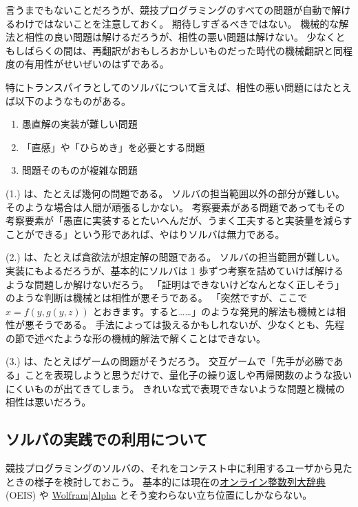 \documentclass{ltjsarticle}
\begin{document}
言うまでもないことだろうが、競技プログラミングのすべての問題が自動で解けるわけではないことを注意しておく。
期待しすぎるべきではない。
機械的な解法と相性の良い問題は解けるだろうが、相性の悪い問題は解けない。
少なくともしばらくの間は、再翻訳がおもしろおかしいものだった時代の機械翻訳と同程度の有用性がせいぜいのはずである。

特にトランスパイラとしてのソルバについて言えば、相性の悪い問題にはたとえば以下のようなものがある。

\begin{enumerate}[label=(\arabic{enumi}.)]
    \item 愚直解の実装が難しい問題
    \item 「直感」や「ひらめき」を必要とする問題
    \item 問題そのものが複雑な問題
\end{enumerate}

(1.) は、たとえば幾何の問題である。
ソルバの担当範囲以外の部分が難しい。
そのような場合は人間が頑張るしかない。
考察要素がある問題であってもその考察要素が「愚直に実装するとたいへんだが、うまく工夫すると実装量を減らすことができる」という形であれば、やはりソルバは無力である。

(2.) は、たとえば貪欲法が想定解の問題である。
ソルバの担当範囲が難しい。
実装にもよるだろうが、基本的にソルバは 1 歩ずつ考察を詰めていけば解けるような問題しか解けないだろう。
「証明はできないけどなんとなく正しそう」のような判断は機械とは相性が悪そうである。
「突然ですが、ここで $x = f(y, g(y, z))$ とおきます。すると……」のような発見的解法も機械とは相性が悪そうである。
手法によっては扱えるかもしれないが、少なくとも、先程の節で述べたような形の機械的解法で解くことはできない。

(3.) は、たとえばゲームの問題がそうだろう。
交互ゲームで「先手が必勝である」ことを表現しようと思うだけで、量化子の繰り返しや再帰関数のような扱いにくいものが出てきてしまう。
きれいな式で表現できないような問題と機械の相性は悪いだろう。



\subsection{ソルバの実践での利用について}

競技プログラミングのソルバの、それをコンテスト中に利用するユーザから見たときの様子を検討しておこう。
基本的には現在の\href{https://oeis.org/}{オンライン整数列大辞典} (OEIS) や \href{https://www.wolframalpha.com/}{Wolfram|Alpha} とそう変わらない立ち位置にしかならない。
\end{document}
